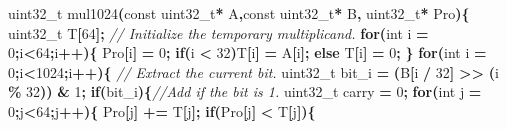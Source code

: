 \documentclass[11pt,a4paper]{ctexart}
\newenvironment{Shaded}{\begin{snugshade}}{\end{snugshade}}
\newcommand{\CommentTok}[1]{\textcolor[rgb]{0.56,0.35,0.01}{\textit{#1}}}
\newcommand{\ControlFlowTok}[1]{\textcolor[rgb]{0.13,0.29,0.53}{\textbf{#1}}}
\newcommand{\DataTypeTok}[1]{\textcolor[rgb]{0.13,0.29,0.53}{#1}}
\newcommand{\DecValTok}[1]{\textcolor[rgb]{0.00,0.00,0.81}{#1}}
\newcommand{\NormalTok}[1]{#1}
\newcommand{\OperatorTok}[1]{\textcolor[rgb]{0.81,0.36,0.00}{\textbf{#1}}}
\renewenvironment{Shaded}{\begin{snugshade}}{\end{snugshade}}
\begin{document}
\begin{Shaded}
\begin{Highlighting}[]
\DataTypeTok{uint32\_t}\NormalTok{ mul1024}\OperatorTok{(}\DataTypeTok{const} \DataTypeTok{uint32\_t}\OperatorTok{*}\NormalTok{ A}\OperatorTok{,}\DataTypeTok{const} \DataTypeTok{uint32\_t}\OperatorTok{*}\NormalTok{ B}\OperatorTok{,} \DataTypeTok{uint32\_t}\OperatorTok{*}\NormalTok{ Pro}\OperatorTok{)\{}
    \DataTypeTok{uint32\_t}\NormalTok{ T}\OperatorTok{[}\DecValTok{64}\OperatorTok{];}
    \CommentTok{// Initialize the temporary multiplicand.}
    \ControlFlowTok{for}\OperatorTok{(}\DataTypeTok{int}\NormalTok{ i }\OperatorTok{=} \DecValTok{0}\OperatorTok{;}\NormalTok{i}\OperatorTok{\textless{}}\DecValTok{64}\OperatorTok{;}\NormalTok{i}\OperatorTok{++)\{}
\NormalTok{        Pro}\OperatorTok{[}\NormalTok{i}\OperatorTok{]} \OperatorTok{=} \DecValTok{0}\OperatorTok{;}
        \ControlFlowTok{if}\OperatorTok{(}\NormalTok{i }\OperatorTok{\textless{}} \DecValTok{32}\OperatorTok{)}\NormalTok{T}\OperatorTok{[}\NormalTok{i}\OperatorTok{]} \OperatorTok{=}\NormalTok{ A}\OperatorTok{[}\NormalTok{i}\OperatorTok{];}
        \ControlFlowTok{else}\NormalTok{ T}\OperatorTok{[}\NormalTok{i}\OperatorTok{]} \OperatorTok{=} \DecValTok{0}\OperatorTok{;}
    \OperatorTok{\}}
    \ControlFlowTok{for}\OperatorTok{(}\DataTypeTok{int}\NormalTok{ i }\OperatorTok{=} \DecValTok{0}\OperatorTok{;}\NormalTok{i}\OperatorTok{\textless{}}\DecValTok{1024}\OperatorTok{;}\NormalTok{i}\OperatorTok{++)\{}
        \CommentTok{// Extract the current bit.}
        \DataTypeTok{uint32\_t}\NormalTok{ bit\_i }\OperatorTok{=} \OperatorTok{(}\NormalTok{B}\OperatorTok{[}\NormalTok{i }\OperatorTok{/} \DecValTok{32}\OperatorTok{]} \OperatorTok{\textgreater{}\textgreater{}} \OperatorTok{(}\NormalTok{i }\OperatorTok{\%} \DecValTok{32}\OperatorTok{))} \OperatorTok{\&} \DecValTok{1}\OperatorTok{;}
        \ControlFlowTok{if}\OperatorTok{(}\NormalTok{bit\_i}\OperatorTok{)\{}\CommentTok{//Add if the bit is 1.}
            \DataTypeTok{uint32\_t}\NormalTok{ carry }\OperatorTok{=} \DecValTok{0}\OperatorTok{;}
            \ControlFlowTok{for}\OperatorTok{(}\DataTypeTok{int}\NormalTok{ j }\OperatorTok{=} \DecValTok{0}\OperatorTok{;}\NormalTok{j}\OperatorTok{\textless{}}\DecValTok{64}\OperatorTok{;}\NormalTok{j}\OperatorTok{++)\{}
\NormalTok{                Pro}\OperatorTok{[}\NormalTok{j}\OperatorTok{]} \OperatorTok{+=}\NormalTok{ T}\OperatorTok{[}\NormalTok{j}\OperatorTok{];}
                \ControlFlowTok{if}\OperatorTok{(}\NormalTok{Pro}\OperatorTok{[}\NormalTok{j}\OperatorTok{]} \OperatorTok{\textless{}}\NormalTok{ T}\OperatorTok{[}\NormalTok{j}\OperatorTok{])\{}

\end{Highlighting}
\end{Shaded}
\end{document}
